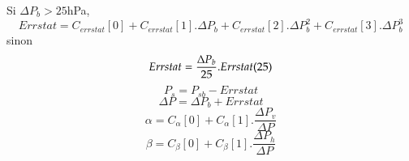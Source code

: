 Si $\Delta P_b > 25 $hPa,
\[
Errstat = C_{errstat}[0] + C_{errstat}[1].\Delta P_b +
	  C_{errstat}[2].\Delta P_b^2 + C_{errstat}[3].\Delta P_b^3 
\]
sinon
\[
Errstat =  {{\Delta P_b} \over 25} . Errstat(25)
\]
\[
P_s = P_{sb} - Errstat
\]
$$
\Delta P = \Delta P_b + Errstat
$$
$$
\alpha = C_{\alpha}[0] + C_{\alpha}[1]. \frac{ \Delta P_v}{\Delta P}
$$
$$
\beta = C_{\beta}[0] + C_{\beta}[1]. \frac{ \Delta P_h}{\Delta P}
$$
